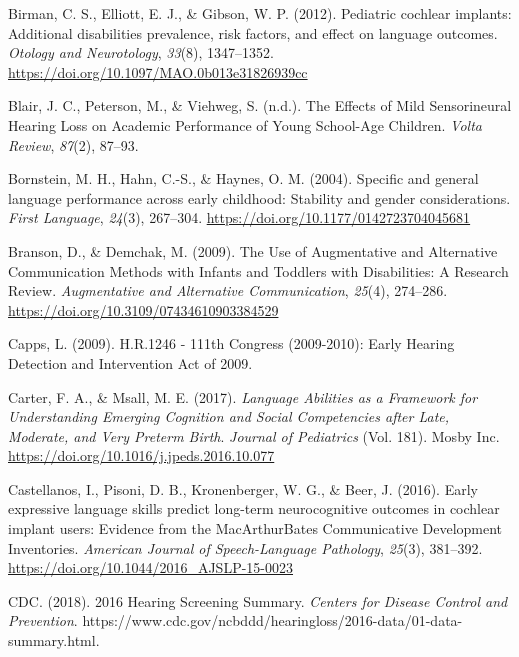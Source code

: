 \documentclass[english,man,floatsintext]{apa6}
\begin{document}
\leavevmode\hypertarget{ref-birman2012}{}%
Birman, C. S., Elliott, E. J., \& Gibson, W. P. (2012). Pediatric cochlear implants: Additional disabilities prevalence, risk factors, and effect on language outcomes. \emph{Otology and Neurotology}, \emph{33}(8), 1347--1352. \url{https://doi.org/10.1097/MAO.0b013e31826939cc}

\leavevmode\hypertarget{ref-blair1985}{}%
Blair, J. C., Peterson, M., \& Viehweg, S. (n.d.). The Effects of Mild Sensorineural Hearing Loss on Academic Performance of Young School-Age Children. \emph{Volta Review}, \emph{87}(2), 87--93.

\leavevmode\hypertarget{ref-bornstein2004}{}%
Bornstein, M. H., Hahn, C.-S., \& Haynes, O. M. (2004). Specific and general language performance across early childhood: Stability and gender considerations. \emph{First Language}, \emph{24}(3), 267--304. \url{https://doi.org/10.1177/0142723704045681}

\leavevmode\hypertarget{ref-branson2009}{}%
Branson, D., \& Demchak, M. (2009). The Use of Augmentative and Alternative Communication Methods with Infants and Toddlers with Disabilities: A Research Review. \emph{Augmentative and Alternative Communication}, \emph{25}(4), 274--286. \url{https://doi.org/10.3109/07434610903384529}

\leavevmode\hypertarget{ref-capps2009}{}%
Capps, L. (2009). H.R.1246 - 111th Congress (2009-2010): Early Hearing Detection and Intervention Act of 2009.

\leavevmode\hypertarget{ref-carter2017}{}%
Carter, F. A., \& Msall, M. E. (2017). \emph{Language Abilities as a Framework for Understanding Emerging Cognition and Social Competencies after Late, Moderate, and Very Preterm Birth}. \emph{Journal of Pediatrics} (Vol. 181). Mosby Inc. \url{https://doi.org/10.1016/j.jpeds.2016.10.077}

\leavevmode\hypertarget{ref-castellanos2016}{}%
Castellanos, I., Pisoni, D. B., Kronenberger, W. G., \& Beer, J. (2016). Early expressive language skills predict long-term neurocognitive outcomes in cochlear implant users: Evidence from the MacArthurBates Communicative Development Inventories. \emph{American Journal of Speech-Language Pathology}, \emph{25}(3), 381--392. \url{https://doi.org/10.1044/2016_AJSLP-15-0023}

\leavevmode\hypertarget{ref-cdc2018}{}%
CDC. (2018). 2016 Hearing Screening Summary. \emph{Centers for Disease Control and Prevention}. https://www.cdc.gov/ncbddd/hearingloss/2016-data/01-data-summary.html.
\end{document}
